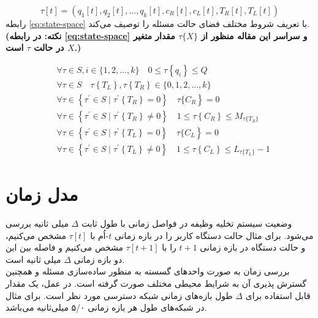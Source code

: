 \begin{equation}
	\label{eg:state}
	\tau[t]=\left(q_{1}[t], q_{2}[t], \ldots, q_{k}[t], c_{R}[t], c_{L}[t], T_{R}[t], T_{L}[t]\right)
\end{equation}
رابطه \ref{eq:state-space} با تعریف شروط مختلف فضای حالت مسئله را توصیف می‌کند. \textbf{(نکته: در رابطه \ref{eq:state-space} و سراسر این مقاله منظور از \(\tau\{X\}\) مقدار متغیر \(X\) در حالت \(\tau\) است.)}

\begin{equation}
	\label{eq:state-space}
	\begin{aligned}
		&\forall \tau \in S, i \in \{1,2, \ldots, k\} \quad 0 \leqslant\tau\left\{q_{i}\right\} \leqslant Q\\
		&\forall \tau \in S \quad  \tau\left\{T_L\right\},  \tau\left\{T_R\right\} \in \{0, 1,2, \ldots, k\}\\
		&\left.\forall \tau \in\left\{\tau^{\prime} \in S \mid \tau^{\prime}\left\{T_{R}\right\}=0\right\} \quad \tau\{C_R\right\}=0\\
		&\forall \tau \in\left\{\tau^{\prime} \in S \mid \tau^{\prime}\left\{T_{R}\right\} \neq 0\right\} \quad 1 \leqslant \tau\left\{C_{R}\right\} \leqslant M_{\tau\{T_{R}\}} \\
		&\left.\forall \tau \in\left\{\tau^{\prime} \in S \mid \tau^{\prime}\left\{T_{L}\right\}=0\right\} \quad \tau\{C_L\right\}=0\\
		&\forall \tau \in\left\{\tau^{\prime} \in S \mid \tau^{\prime}\left\{T_{L}\right\} \neq 0\right\} \quad 1 \leqslant \tau\left\{C_{L}\right\} \leqslant L_{\tau\{T_{L}\}} - 1
	\end{aligned}
\end{equation}

\newpage
\section{مدل زمان}
وضعیت سیستم تخلیه وظیفه در فواصل زمانی با طول ثابت \(\Delta\) میلی ثانیه بررسی می‌شود. برای مثال حالت دستگاه کاربر را در بازه زمانی \(t\)-اُم با \(\tau[t]\) مشخص می‌کنیم، و حالت دستگاه در بازه زمانی \(t + 1\) را با \(\tau[t + 1]\) مشخص می‌کنیم و فاصله بین این دو بازه زمانی \(\Delta\) میلی ثانیه است. \\

بررسی زمان به صورت واحدهای گسسته به منظور ساده‌سازی مسئله و همچنین گسترش پذیری آن به شرایط محیطی مختلف صورت گرفته است. در عمل، یک مقدار قابل استفاده برای \(\Delta\) طول بازه‌های زمانی شبکه دسترسی مورد نظر است. برای مثال در شبکه‌های  طول هر بازه زمانی ۵/۰ میلی‌ثانیه می‌باشد. \cite{LTE}

